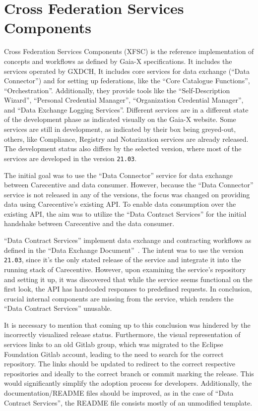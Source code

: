 \section{Cross Federation Services Components}\label{sec:cross-federation-services-components}

Cross Federation Services Components (XFSC) is the reference implementation of concepts and workflows as defined by Gaia-X specifications.
It includes the services operated by GXDCH,
It includes core services for data exchange (``Data Connector'') and for setting up federations, like the ``Core Catalogue Functions'', ``Orchestration''.
Additionally, they provide tools like the ``Self-Description Wizard'', ``Personal Credential Manager'', ``Organization Credential Manager'', and ``Data Exchange Logging Services''.
Different services are in a different state of the development phase as indicated visually on the Gaia-X website\cite{gaiax}.
Some services are still in development, as indicated by their box being greyed-out, others, like Compliance, Registry and Notarization services are already released.
The development status also differs by the selected version, where most of the services are developed in the version \texttt{21.03}.

The initial goal was to use the ``Data Connector'' service for data exchange between Carecentive and data consumer.
However, because the ``Data Connector'' service is not released in any of the versions, the focus was changed on providing data using Carecentive's existing API.
To enable data consumption over the existing API, the aim was to utilize the ``Data Contract Services'' for the initial handshake between Carecentive and the data consumer.

``Data Contract Services'' implement data exchange and contracting workflows as defined in the ``Data Exchange Document''~\cite{gaiax_data_exchange_document}.
The intent was to use the version \texttt{21.03}, since it's the only stated release of the service and integrate it into the running stack of Carecentive.
However, upon examining the service's repository and setting it up, it was discovered that while the service seems functional on the first look, the API has hardcoded responses to predefined requests.
In conclusion, crucial internal components are missing from the service, which renders the ``Data Contract Services'' unusable.

It is necessary to mention that coming up to this conclusion was hindered by the incorrectly visualized release status.
Furthermore, the visual representation of services links to an old Gitlab group, which was migrated to the Eclipse Foundation Gitlab account, leading to the need to search for the correct repository.
The links should be updated to redirect to the correct respective repositories and ideally to the correct branch or commit marking the release.
This would significantly simplify the adoption process for developers.
Additionally, the documentation/README files should be improved, as in the case of ``Data Contract Services'', the README file consists mostly of an unmodified template.

